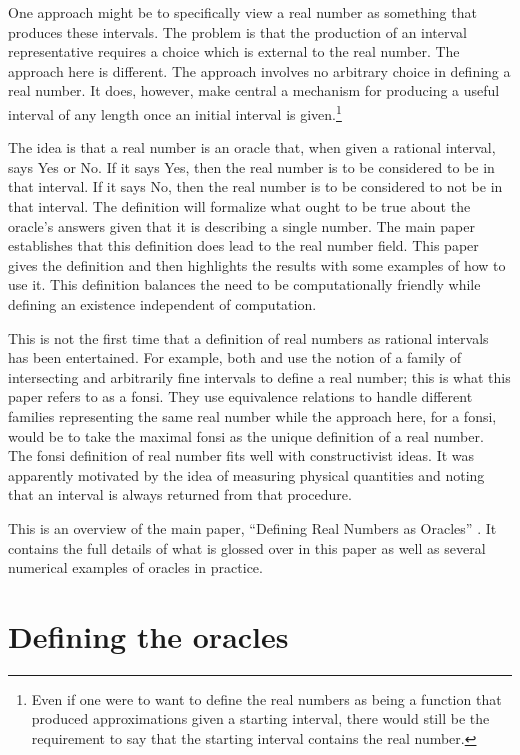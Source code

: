\documentclass[12pt]{article}
\theoremstyle{remark}
\begin{document}
One approach might be to specifically view a real number as something that produces these intervals. The problem is that the production of an interval representative requires a choice which is external to the real number. The approach here is different. The approach involves no arbitrary choice in defining a real number. It does, however, make central a mechanism for producing a useful interval of any length once an initial interval is given.\footnote{Even if one were to want to define the real numbers as being a function that produced approximations given a starting interval, there would still be the requirement to say that the starting interval contains the real number.}

The idea is that a real number is an oracle that, when given a rational interval, says Yes or No. If it says Yes, then the real number is to be considered to be in that interval. If it says No, then the real number is to be considered to not be in that interval. The definition will formalize what ought to be true about the oracle's answers given that it is describing a single number. The main paper establishes that this definition does lead to the real number field. This paper gives the definition and then highlights the results with some examples of how to use it. This definition balances the need to be computationally friendly while defining an existence independent of computation. 

This is not the first time that a definition of real numbers as rational intervals has been entertained. For example, both \cite{bridger} and \cite{bridges} use the notion of a family of intersecting and arbitrarily fine intervals to define a real number; this is what this paper refers to as a fonsi. They use equivalence relations to handle different families representing the same real number while the approach here, for a fonsi, would be to take the maximal fonsi as the unique definition of a real number. The fonsi definition of real number fits well with constructivist ideas. It was apparently motivated by the idea of measuring physical quantities and noting that an interval is always returned from that procedure. 

This is an overview of the main paper, ``Defining Real Numbers as Oracles'' \cite{taylor23main}. It contains the full details of what is glossed over in this paper as well as several numerical examples of oracles in practice. 

\section{Defining the oracles}\label{sec:ora}
\end{document}
